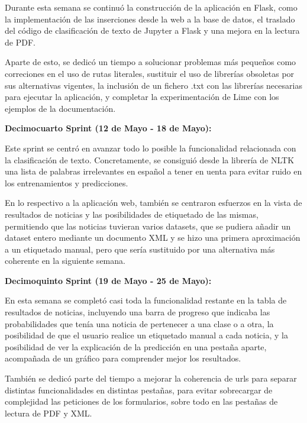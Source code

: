 Durante esta semana se continuó la construcción de la aplicación en Flask, como la implementación de las inserciones desde la web a la base de datos, el traslado del código de clasificación de texto de Jupyter a Flask y una mejora en la lectura de PDF.

Aparte de esto, se dedicó un tiempo a solucionar problemas más pequeños como correciones en el uso de rutas literales, sustituir el uso de librerías obsoletas por sus alternativas vigentes, la inclusión de un fichero .txt con las librerías necesarias para ejecutar la aplicación, y completar la experimentación de Lime con los ejemplos de la documentación.



\textbf{Decimocuarto Sprint (12 de Mayo - 18 de Mayo):}

Este sprint se centró en avanzar todo lo posible la funcionalidad relacionada con la clasificación de texto. Concretamente, se consiguió desde la librería de NLTK una lista de palabras irrelevantes en español a tener en uenta para evitar ruido en los entrenamientos y predicciones. 

En lo respectivo a la aplicación web, también se centraron esfuerzos en la vista de resultados de noticias y las posibilidades de etiquetado de las mismas, permitiendo que las noticias tuvieran varios datasets, que se pudiera añadir un dataset entero mediante un documento XML y se hizo una primera aproximación a un etiquetado manual, pero que sería sustituido por una alternativa más coherente en la siguiente semana.



\textbf{Decimoquinto Sprint (19 de Mayo - 25 de Mayo):}

En esta semana se completó casi toda la funcionalidad restante en la tabla de resultados de noticias, incluyendo una barra de progreso que indicaba las probabilidades que tenía una noticia de pertenecer a una clase o a otra, la posibilidad de que el usuario realice un etiquetado manual a cada noticia, y la posibilidad de ver la explicación de la predicción en una pestaña aparte, acompañada de un gráfico para comprender mejor los resultados.

También se dedicó parte del tiempo a mejorar la coherencia de urls para separar distintas funcionalidades en distintas pestañas, para evitar sobrecargar de complejidad las peticiones de los formularios, sobre todo en las pestañas de lectura de PDF y XML.

